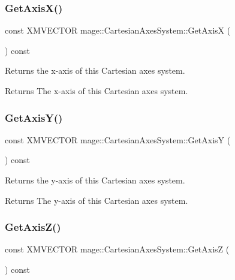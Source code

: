 \subsubsection{\texorpdfstring{Get\+Axis\+X()}{GetAxisX()}}
{\footnotesize\ttfamily const X\+M\+V\+E\+C\+T\+OR mage\+::\+Cartesian\+Axes\+System\+::\+Get\+AxisX (\begin{DoxyParamCaption}{ }\end{DoxyParamCaption}) const}

Returns the x-\/axis of this Cartesian axes system.

\begin{DoxyReturn}{Returns}
The x-\/axis of this Cartesian axes system. 
\end{DoxyReturn}
\hypertarget{structmage_1_1_cartesian_axes_system_ad681b7fa6e591c1446c6882c820982ba}{}\label{structmage_1_1_cartesian_axes_system_ad681b7fa6e591c1446c6882c820982ba} 
\subsubsection{\texorpdfstring{Get\+Axis\+Y()}{GetAxisY()}}
{\footnotesize\ttfamily const X\+M\+V\+E\+C\+T\+OR mage\+::\+Cartesian\+Axes\+System\+::\+Get\+AxisY (\begin{DoxyParamCaption}{ }\end{DoxyParamCaption}) const}

Returns the y-\/axis of this Cartesian axes system.

\begin{DoxyReturn}{Returns}
The y-\/axis of this Cartesian axes system. 
\end{DoxyReturn}
\hypertarget{structmage_1_1_cartesian_axes_system_a999919e63e9bedcdbda833011701d427}{}\label{structmage_1_1_cartesian_axes_system_a999919e63e9bedcdbda833011701d427} 
\subsubsection{\texorpdfstring{Get\+Axis\+Z()}{GetAxisZ()}}
{\footnotesize\ttfamily const X\+M\+V\+E\+C\+T\+OR mage\+::\+Cartesian\+Axes\+System\+::\+Get\+AxisZ (\begin{DoxyParamCaption}{ }\end{DoxyParamCaption}) const}


